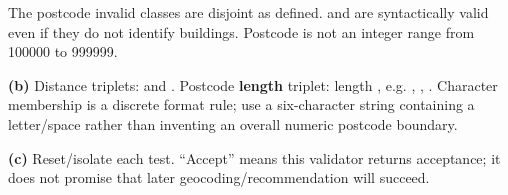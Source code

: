 \begin{studycolumns}
\vspace{0pt}

The postcode invalid classes are disjoint as defined.  and  are syntactically valid even if they do not identify buildings. Postcode is not an integer range from 100000 to 999999.

\textbf{(b)} Distance triplets:  and . Postcode \textbf{length} triplet: length , e.g. , , . Character membership is a discrete format rule; use a six-character string containing a letter/\allowbreak{}space rather than inventing an overall numeric postcode boundary.

\textbf{(c)} Reset/\allowbreak{}isolate each test. ``Accept'' means this validator returns acceptance; it does not promise that later geocoding/\allowbreak{}recommendation will succeed.
\end{studycolumns}


